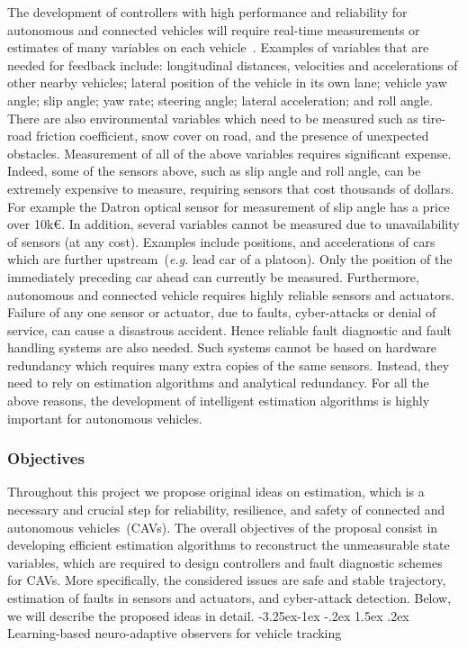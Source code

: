 \documentclass[a4paper,11pt]{article}
\makeatletter
\newcounter {subsubsubsection}[subsubsection]
\newcommand\subsubsubsection{\@startsection{subsubsubsection}{4}{\z@}%
                                     {-3.25ex\@plus -1ex \@minus -.2ex}%
                                     {1.5ex \@plus .2ex}%
                                     {\normalfont\normalsize\bfseries}}
\makeatother
\begin{document}
The development of controllers with high performance and reliability for autonomous and connected vehicles will require real-time measurements or estimates of many variables on each vehicle~\cite{RajamaniBOOK}. Examples of variables that are needed for feedback include: longitudinal distances, velocities and accelerations of other nearby vehicles; lateral position of the vehicle in its own lane; vehicle yaw angle; slip angle; yaw rate; steering angle; lateral acceleration; and roll angle. There are also environmental variables which need to be measured such as tire-road friction coefficient, snow cover on road, and the presence of unexpected obstacles.
%
Measurement of all of the above variables requires significant expense. Indeed, some of the sensors above, such as slip angle and roll angle, can be extremely expensive to measure, requiring sensors that cost thousands of dollars. For example the Datron optical sensor for measurement of slip angle has a price over 10k\euro. In addition, several variables cannot be measured due to unavailability of sensors (at any cost). Examples include positions, and accelerations of cars which are further upstream~({\it e.g.} lead car of a platoon). Only the position of the immediately preceding car ahead can currently be measured. 
%
Furthermore, autonomous and connected vehicle requires highly reliable sensors and actuators. Failure of any one sensor or actuator, due to faults, cyber-attacks or denial of service, can cause a disastrous accident. Hence reliable fault diagnostic and fault handling systems are also needed. Such systems cannot be based on hardware redundancy which requires many extra copies of the same sensors. Instead, they need to rely on estimation algorithms and analytical redundancy. For all the above reasons, the development of intelligent estimation algorithms is highly important for autonomous vehicles. %


\subsubsection{Objectives}\label{s1.2}

Throughout this project we propose original ideas on estimation, which is a necessary and crucial step for reliability, resilience, and safety of connected and autonomous vehicles~(CAVs). The overall objectives of the proposal consist in developing efficient estimation algorithms to reconstruct the unmeasurable state variables, which are required to design controllers and fault diagnostic schemes for CAVs. More specifically, the considered issues are safe and stable trajectory, estimation of faults in sensors and actuators, and cyber-attack detection. Below, we will describe the proposed ideas in detail.
\subsubsubsection{Learning-based neuro-adaptive observers for vehicle tracking}
\end{document}
